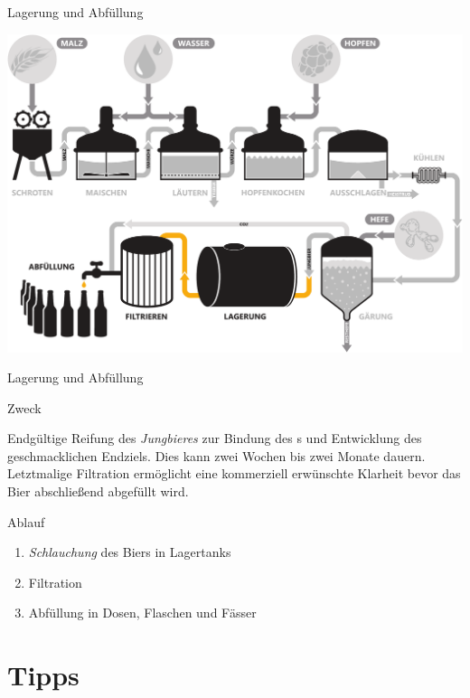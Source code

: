 \documentclass[9pt, ngerman]{beamer}
\begin{document}
\begin{frame}{Lagerung und Abfüllung}
  \begin{center}
    \vspace{0.5cm}
    \includegraphics[width=\textwidth]{pdfs/prozess-ende.pdf}
  \end{center}
\end{frame}
\begin{frame}{Lagerung und Abfüllung}
  \begin{block}{Zweck}
    \vspace{0.5em}

    Endgültige Reifung des \emph{Jungbieres} zur Bindung des s und
    Entwicklung des geschmacklichen Endziels. Dies kann zwei Wochen bis zwei
    Monate dauern. Letztmalige Filtration ermöglicht eine kommerziell erwünschte
    Klarheit bevor das Bier abschließend abgefüllt wird.

  \end{block}

  \begin{block}{Ablauf}
    \begin{enumerate}
      \item \emph{Schlauchung} des Biers in Lagertanks
      \item Filtration
      \item Abfüllung in Dosen, Flaschen und Fässer
    \end{enumerate}
  \end{block}
\end{frame}

\section{Tipps}
\end{document}
